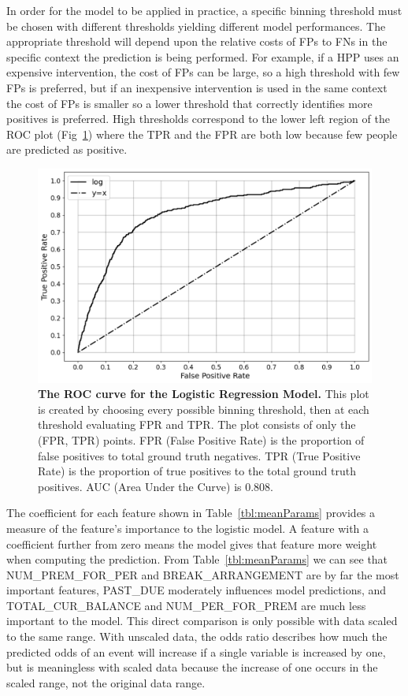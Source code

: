 \documentclass[10pt,letterpaper]{article}
\newcommand{\red}[1]{{\color{red}{#1}}}
\begin{document}
In order for the model to be applied in practice, a specific binning threshold must be chosen with different thresholds yielding different model performances. The appropriate threshold will depend upon the relative costs of FPs to FNs in the specific context the prediction is being performed. For example, if a HPP uses an expensive intervention, the cost of FPs can be large, so a high threshold with few FPs is preferred, but if an inexpensive intervention is used in the same context the cost of FPs is smaller so a lower threshold that correctly identifies more positives is preferred. High thresholds correspond to the lower left region of the ROC plot (Fig~\ref{fig:ROC}) where the TPR and the FPR are both low because few people are predicted as positive. \red{reduce or remove paragraph?}

\begin{figure}[htb]
    \centering
    \includegraphics[width=\textwidth]{Fig4.png} %
    \caption[ROC curve]{{\bf The ROC curve for the Logistic Regression Model.} This plot is created by choosing every possible binning threshold, then at each threshold evaluating FPR and TPR. The plot consists of only the (FPR, TPR) points. FPR (False Positive Rate) is the proportion of false positives to total ground truth negatives. TPR (True Positive Rate) is the proportion of true positives to the total ground truth positives. AUC (Area Under the Curve) is 0.808.}
    \label{fig:ROC}
\end{figure}

The coefficient for each feature shown in Table~\ref{tbl:meanParams} provides a measure of the feature's importance to the logistic model. A feature with a coefficient further from zero means the model gives that feature more weight when computing the prediction. From Table~\ref{tbl:meanParams} we can see that NUM\_PREM\_FOR\_PER and BREAK\_ARRANGEMENT are by far the most important features, PAST\_DUE moderately influences model predictions, and TOTAL\_CUR\_BALANCE and NUM\_PER\_FOR\_PREM are much less important to the model. This direct comparison is only possible with data scaled to the same range. With unscaled data, the odds ratio describes how much the predicted odds of an event will increase if a single variable is increased by one, but is meaningless with scaled data because the increase of one occurs in the scaled range, not the original data range. 
\end{document}
